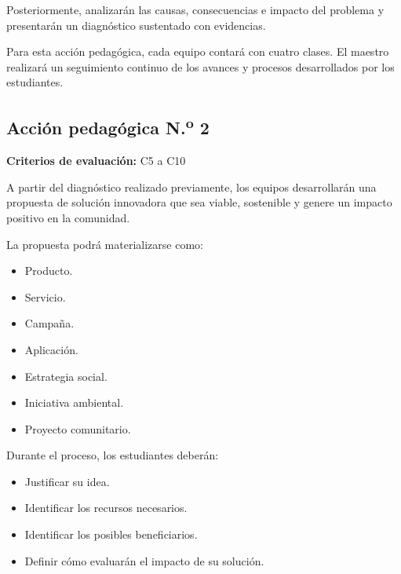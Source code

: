 \documentclass[12pt,a4paper]{article}
\begin{document}
	Posteriormente, analizarán las causas, consecuencias e impacto del
	problema y presentarán un diagnóstico sustentado con evidencias.
	
	Para esta acción pedagógica, cada equipo contará con cuatro clases.
	El maestro realizará un seguimiento continuo de los avances y
	procesos desarrollados por los estudiantes.
	
	
	\subsection{Acción pedagógica N.\textsuperscript{o} 2}
	
	\textbf{Criterios de evaluación:} C5 a C10
	
	A partir del diagnóstico realizado previamente, los equipos
	desarrollarán una propuesta de solución innovadora que sea viable,
	sostenible y genere un impacto positivo en la comunidad.
	
	La propuesta podrá materializarse como:
	
	\begin{itemize}
		
		\item Producto.
		
		\item Servicio.
		
		\item Campaña.
		
		\item Aplicación.
		
		\item Estrategia social.
		
		\item Iniciativa ambiental.
		
		\item Proyecto comunitario.
		
	\end{itemize}
	
	Durante el proceso, los estudiantes deberán:
	
	\begin{itemize}
		
		\item Justificar su idea.
		
		\item Identificar los recursos necesarios.
		
		\item Identificar los posibles beneficiarios.
		
		\item Definir cómo evaluarán el impacto de su solución.
		
	\end{itemize}
	
\end{document}
